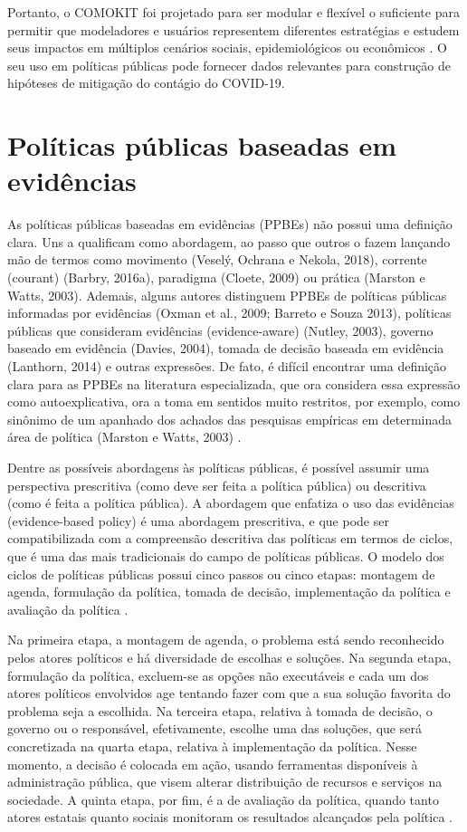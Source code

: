 Portanto, o COMOKIT foi projetado para ser modular e flexível o suficiente para permitir que modeladores e usuários representem diferentes estratégias e estudem seus impactos em múltiplos cenários sociais, epidemiológicos ou econômicos \cite{ArtigoComokit:online}. O seu uso em políticas públicas pode fornecer dados relevantes para construção de hipóteses de mitigação do contágio do COVID-19.


\section{Políticas públicas baseadas em evidências}

As políticas públicas baseadas em evidências (PPBEs) não possui uma definição clara. Uns a qualificam como abordagem, ao passo que outros o fazem lançando mão de termos como movimento (Veselý, Ochrana e Nekola, 2018), corrente (courant) (Barbry, 2016a), paradigma (Cloete, 2009) ou prática (Marston e Watts, 2003). Ademais, alguns autores distinguem PPBEs de políticas públicas informadas por evidências (Oxman et al., 2009; Barreto e Souza 2013), políticas públicas que consideram evidências (evidence-aware) (Nutley, 2003),
governo baseado em evidência (Davies, 2004), tomada de decisão baseada em evidência (Lanthorn, 2014) e outras expressões. De fato, é difícil encontrar uma definição clara para as PPBEs na literatura especializada, que ora considera essa expressão como autoexplicativa, ora a toma em sentidos muito restritos, por exemplo, como sinônimo de um apanhado dos achados das pesquisas empíricas em determinada área de política (Marston e Watts, 2003) \cite{PPBEiPEA:online}.

Dentre as possíveis abordagens às políticas públicas, é possível assumir uma perspectiva prescritiva (como deve ser feita a política pública) ou descritiva (como é feita a política pública). A abordagem que enfatiza o uso das evidências (evidence-based policy) é uma abordagem prescritiva, e que pode ser compatibilizada com a compreensão descritiva das políticas em termos de ciclos, que é uma das mais tradicionais do campo de políticas públicas. O modelo dos ciclos de políticas públicas possui cinco passos ou cinco etapas: montagem de agenda, formulação da política, tomada de decisão, implementação da política e avaliação da política \cite{de2018politicas}.

Na primeira etapa, a montagem de agenda, o problema está sendo reconhecido pelos atores políticos e há diversidade de escolhas e soluções. Na segunda etapa, formulação da política, excluem-se as opções não executáveis e cada um dos atores políticos envolvidos age tentando fazer com que a sua solução favorita do problema seja a escolhida. Na terceira etapa, relativa à tomada de decisão, o governo ou o responsável, efetivamente, escolhe uma das soluções, que será concretizada na quarta etapa, relativa à implementação da política. Nesse momento, a decisão é colocada em ação, usando ferramentas disponíveis à administração pública, que visem alterar distribuição de recursos e serviços na sociedade. A quinta etapa, por fim, é a de avaliação da política, quando tanto atores estatais quanto sociais monitoram os resultados alcançados pela política \cite{de2018politicas}.

